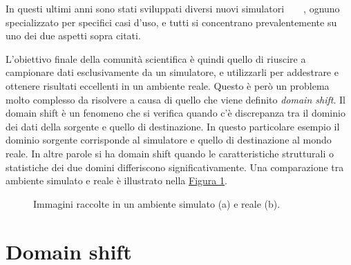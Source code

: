 \documentclass[12pt]{report}
\begin{document}
In questi ultimi anni sono stati sviluppati diversi nuovi simulatori~\cite{kolve2022ai2thorinteractive3denvironment}~\cite{NEURIPS2021_021bbc7e}~\cite{urakami2022doorgymscalabledooropening}~\cite{1389727}, ognuno specializzato per specifici casi d'uso, e tutti si concentrano prevalentemente su uno dei due aspetti sopra citati.

L'obiettivo finale della comunità scientifica è quindi quello di riuscire a campionare dati esclusivamente da un simulatore, e utilizzarli per addestrare e ottenere risultati eccellenti in un ambiente reale. Questo è però un problema molto complesso da risolvere a causa di quello che viene definito \textit{domain shift}. Il domain shift è un fenomeno che si verifica quando c'è discrepanza tra il dominio dei dati della sorgente e quello di destinazione. In questo particolare esempio il dominio sorgente corrisponde al simulatore e quello di destinazione al mondo reale. In altre parole si ha domain shift quando le caratteristiche strutturali o statistiche dei due domini differiscono significativamente. Una comparazione tra ambiente simulato e reale è illustrato nella \hyperref[fig:immagine-simulata-reale]{Figura \ref{fig:immagine-simulata-reale}}.


\begin{figure}[t]
	\centering
	\hspace{0.01\textwidth}
	\caption{Immagini raccolte in un ambiente simulato (a) e reale (b).}
	\label{fig:immagine-simulata-reale}
\end{figure}

\section{Domain shift}
\label{sec:domain_shift}
\end{document}
